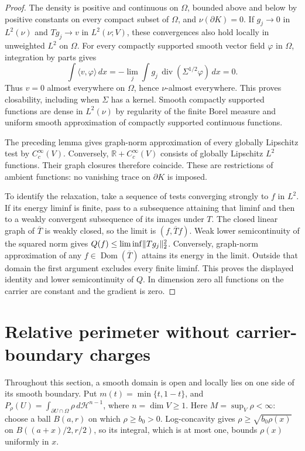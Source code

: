 \begin{proof}
  \leanok
  The density is positive and continuous on $\Omega$, bounded above and below by positive
  constants on every compact subset of $\Omega$, and $\nu(\partial K)=0$. If $g_j\to0$ in
  $L^2(\nu)$ and $Tg_j\to v$ in $L^2(\nu;V)$, these convergences also hold locally in
  unweighted $L^2$ on $\Omega$. For every compactly supported smooth vector field $\varphi$
  in $\Omega$, integration by parts gives
  \[
    \int\langle v,\varphi\rangle\,dx
      =-\lim_j\int g_j\,\operatorname{div}(\Sigma^{1/2}\varphi)\,dx=0.
  \]
  Thus $v=0$ almost everywhere on $\Omega$, hence $\nu$-almost everywhere. This proves
  closability, including when $\Sigma$ has a kernel. Smooth compactly supported functions
  are dense in $L^2(\nu)$ by regularity of the finite Borel measure and uniform smooth
  approximation of compactly supported continuous functions.

  The preceding lemma gives graph-norm approximation of every globally Lipschitz test by
  $C_c^\infty(V)$. Conversely, $\mathbb R+C_c^\infty(V)$ consists of globally Lipschitz
  $L^2$ functions. Their graph closures therefore coincide. These are restrictions of ambient
  functions: no vanishing trace on $\partial K$ is imposed.

  To identify the relaxation, take a sequence of tests converging strongly to $f$ in $L^2$.
  If its energy liminf is finite, pass to a subsequence attaining that liminf and then to a
  weakly convergent subsequence of its images under $T$. The closed linear graph of
  $\overline T$ is weakly closed, so the limit is $(f,\overline T f)$. Weak lower
  semicontinuity of the squared norm gives $Q(f)\le\liminf\lVert Tg_j\rVert_2^2$.
  Conversely, graph-norm approximation of any $f\in\operatorname{Dom}(\overline T)$
  attains its energy in the limit. Outside that domain the first argument excludes every
  finite liminf. This proves the displayed identity and lower semicontinuity of $Q$.
  In dimension zero all functions on the carrier are constant and the gradient is zero.
\end{proof}

\section{Relative perimeter without carrier-boundary charges}

Throughout this section, a smooth domain is open and locally lies on one side of its smooth
boundary. Put $m(t)=\min\{t,1-t\}$, and
$P_\rho(U)=\int_{\partial U\cap\Omega}\rho\,d\mathcal H^{n-1}$, where $n=\dim V\ge1$.
Here $M=\sup_V\rho<\infty$: choose a ball $B(a,r)$ on which $\rho\ge b_0>0$.
Log-concavity gives $\rho\ge\sqrt{b_0\rho(x)}$ on $B((a+x)/2,r/2)$, so its integral,
which is at most one, bounds $\rho(x)$ uniformly in $x$.

